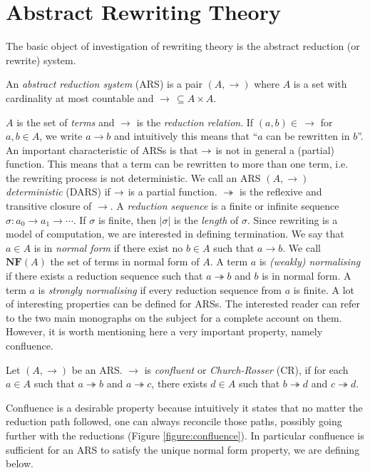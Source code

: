 \section{Abstract Rewriting Theory}
The basic object of investigation of rewriting theory is the abstract reduction (or rewrite) system. 
\begin{definition}
	An \emph{abstract reduction system} (ARS) is a pair $(A,\rightarrow)$ where $A$ is a set with cardinality at most countable and $\rightarrow\,\subseteq A\times A$.
\end{definition}
$A$ is the set of \emph{terms} and $\rightarrow$ is the \emph{reduction relation}. If $(a,b)\in\,\rightarrow$ for $a,b\in A$, we write $a\rightarrow b$ and intuitively this means that ``$a$ can be rewritten in $b$''. An important characteristic of ARSs is that $\rightarrow$ is not in general a (partial) function. This means that a term can be rewritten to more than one term, i.e. the rewriting process is not deterministic. We call an ARS $(A,\rightarrow)$ \emph{deterministic} (DARS) if $\rightarrow$ is a partial function. $\twoheadrightarrow$ is the reflexive and transitive closure of $\rightarrow$. A \emph{reduction sequence} is a finite or infinite sequence $\sigma:a_0\rightarrow a_1\rightarrow\cdots$. If $\sigma$ is finite, then $|\sigma|$ is the \emph{length} of $\sigma$. Since rewriting is a model of computation, we are interested in defining termination. We say that $a\in A$ is in \emph{normal form} if there exist no $b\in A$ such that $a\rightarrow b$. We call $\mathbf{NF}(A)$ the set of terms in normal form of $A$. A term $a$ is \emph{(weakly) normalising} if there exists a reduction sequence such that $a\twoheadrightarrow b$ and $b$ is in normal form. A term $a$ is \emph{strongly normalising} if every reduction sequence from $a$ is finite.  A lot of interesting properties can be defined for ARSs. The interested reader can refer to the two main monographs on the subject \cite{terese_term_2003,baader_term_1999} for a complete account on them. However, it is worth mentioning here a very important property, namely confluence.
\begin{definition}
	Let $(A,\rightarrow)$ be an ARS. $\rightarrow$ is \emph{confluent} or \emph{Church-Rosser} (CR), if for each $a\in A$ such that $a\twoheadrightarrow b$ and $a\twoheadrightarrow c$, there exists $d\in A$ such that $b\twoheadrightarrow d$ and $c\twoheadrightarrow d$.
\end{definition}
Confluence is a desirable property because intuitively it states that no matter the reduction path followed, one can always reconcile those paths, possibly going further with the reductions (Figure \ref{figure:confluence}). In particular confluence is sufficient for an ARS to satisfy the unique normal form property, we are defining below.
